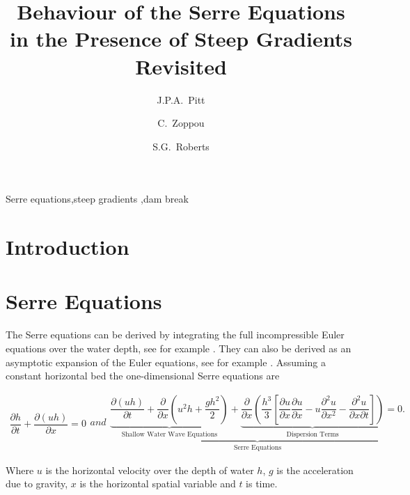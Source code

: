 \documentclass[times]{elsarticle}
\begin{document}
\title{Behaviour of the Serre Equations in the Presence of Steep Gradients Revisited}

\author[ANU]{J.P.A.~Pitt}
\author[ANU]{C.~Zoppou}
\author[ANU]{S.G.~Roberts}

\address[ANU]{Mathematical Sciences Institute, Australian National University, Canberra, ACT 0200, Australia}
 \begin{abstract}

 \end{abstract}	
 
  \begin{keyword}
  	Serre equations\sep steep gradients \sep dam break
  \end{keyword}
  
 \maketitle
\linenumbers
\section{Introduction} \label{intro} 

\section{Serre Equations}
\label{section:Serre Equations}
The Serre equations can be derived by integrating the full incompressible Euler equations over the water depth, see for example \cite{Su-Gardener-1969-536}. They can also be derived as an asymptotic expansion of the Euler equations, see for example \cite{Bonneton-Lannes-2009-16601}. Assuming a constant horizontal bed the one-dimensional Serre equations are \cite{Guyenne-etal-2014-169}
\begin{linenomath*}
\begin{subequations}\label{eq:Serre_nonconservative_form}
\begin{gather}
\dfrac{\partial h}{\partial t} + \dfrac{\partial (uh)}{\partial x} = 0
\label{eq:Serre_continuity}
\end{gather}
and
\begin{gather}
\underbrace{\underbrace{\dfrac{\partial (uh)}{\partial t} + \dfrac{\partial}{\partial x} \left ( u^2h + \dfrac{gh^2}{2}\right )}_{\text{Shallow Water Wave Equations}} + \underbrace{\dfrac{\partial}{\partial x} \left (  \dfrac{h^3}{3} \left [ \dfrac{\partial u }{\partial x} \dfrac{\partial u}{\partial x} - u\dfrac{\partial^2 u}{\partial x^2}  - \dfrac{\partial^2 u}{\partial x \partial t}\right ] \right )}_{\text{Dispersion Terms}} = 0.}_{\text{Serre Equations}}
\label{eq:Serre_momentum}
\end{gather}
\end{subequations}
\end{linenomath*}
Where $u$ is the  horizontal velocity over the depth of water $h$, $g$ is the acceleration due to gravity, $x$ is the horizontal spatial variable and $t$ is time. 
\end{document}
